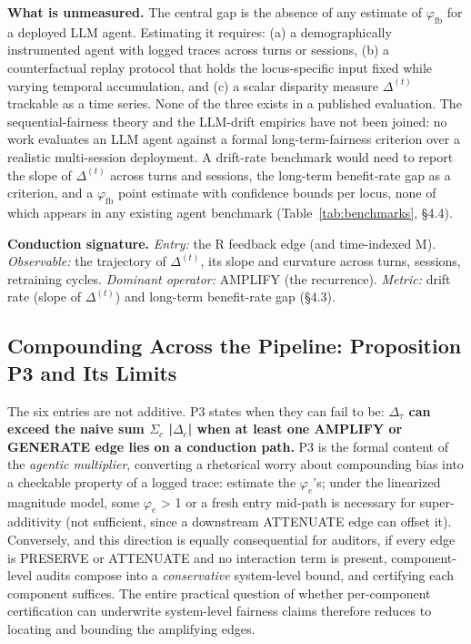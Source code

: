 \documentclass[acmsmall,nonacm]{acmart}
\begin{document}
\textbf{What is unmeasured.} The central gap is the absence of any estimate of $\varphi_{\mathrm{fb}}$ for a deployed LLM agent. Estimating it requires: (a) a demographically instrumented agent with logged traces across turns or sessions, (b) a counterfactual replay protocol that holds the locus-specific input fixed while varying temporal accumulation, and (c) a scalar disparity measure $\Delta^{(t)}$ trackable as a time series. None of the three exists in a published evaluation. The sequential-fairness theory \cite{hu2022achieving,xu2024adapting} and the LLM-drift empirics \cite{fan2024fairmt,ma2026implicit} have not been joined: no work evaluates an LLM agent against a formal long-term-fairness criterion over a realistic multi-session deployment. A drift-rate benchmark would need to report the slope of $\Delta^{(t)}$ across turns and sessions, the long-term benefit-rate gap \cite{xu2024adapting} as a criterion, and a $\varphi_{\mathrm{fb}}$ point estimate with confidence bounds per locus, none of which appears in any existing agent benchmark (Table~\ref{tab:benchmarks}, \S{}4.4).

\textbf{Conduction signature.} \emph{Entry:} the R feedback edge (and time-indexed M). \emph{Observable:} the trajectory of $\Delta^{(t)}$, its slope and curvature across turns, sessions, retraining cycles. \emph{Dominant operator:} AMPLIFY (the recurrence). \emph{Metric:} drift rate (slope of $\Delta^{(t)}$) and long-term benefit-rate gap \cite{xu2024adapting} (\S{}4.3).

\subsection{Compounding Across the Pipeline: Proposition P3 and Its Limits}

The six entries are not additive. P3 states when they can fail to be: \textbf{$\Delta_\tau$ can exceed the naive sum $\Sigma_c$ |$\Delta_c$| when at least one AMPLIFY or GENERATE edge lies on a conduction path.} P3 is the formal content of the \emph{agentic multiplier}, converting a rhetorical worry about compounding bias into a checkable property of a logged trace: estimate the $\varphi_e$'s; under the linearized magnitude model, some $\varphi_e$ > 1 or a fresh entry mid-path is necessary for super-additivity (not sufficient, since a downstream ATTENUATE edge can offset it). Conversely, and this direction is equally consequential for auditors, if every edge is PRESERVE or ATTENUATE and no interaction term is present, component-level audits compose into a \emph{conservative} system-level bound, and certifying each component suffices. The entire practical question of whether per-component certification can underwrite system-level fairness claims therefore reduces to locating and bounding the amplifying edges.
\end{document}
